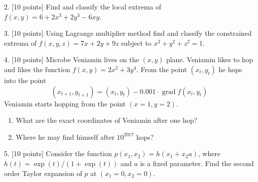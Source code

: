 \documentclass[12pt,a4paper]{article}
\DeclareMathOperator{\grad}{grad}
\begin{document}
2. {[10 points]} Find and classify the local extrema of $f(x,y) = 6 + 2x^3 + 2y^3 - 6xy$.

\newpage
{}

3. {[10 points]} Using Lagrange multiplier method find and classify the constrained extrema of $f(x, y, z) =  7x +2y + 9z$ subject to $x^2 + y^2 + z^2 = 1$.



\newpage
{}

4. {[10 points]} Microbe Veniamin lives on the $(x, y)$ plane. Veniamin likes to hop and likes the function $f(x, y) = 2x^2 + 3y^4$. From the point $(x_t, y_t)$ he hops into the point
\[
(x_{t+1},y_{t+1})=(x_t, y_t) - 0.001\cdot \grad f(x_t, y_t)
\]
Veniamin starts hopping from the point $(x=1, y =2)$.

\begin{enumerate}
  \item What are the exact coordinates of Veniamin after one hop?
  \item Where he may find himself after $10^{2017}$ hops?
\end{enumerate}

\newpage
{}

5. {[10 points]} Consider the function $p(x_1, x_2) = h(x_1 + x_2 a)$, where $h(t) = \exp(t)/(1+\exp(t))$ and $a$ is a fixed parameter. Find the second order Taylor expansion of $p$ at $(x_1=0, x_2=0)$.
\end{document}
